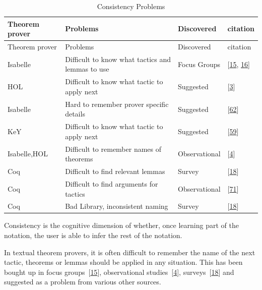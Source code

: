 \documentclass[
]{article}
\begin{document}
\hypertarget{tbl:consistency}{}
\begin{longtable}[]{@{}llll@{}}
\caption{\label{tbl:consistency}Consistency Problems}\tabularnewline
\toprule
Theorem prover & Problems & Discovered & citation \\
\midrule
\endfirsthead
\toprule
Theorem prover & Problems & Discovered & citation \\
\midrule
\endhead
Isabelle & Difficult to know what tactics and lemmas to use & Focus
Groups & {[}\protect\hyperlink{ref-beckert_usability_2015}{15},
\protect\hyperlink{ref-beckert_interaction_2017}{16}{]} \\
HOL & Difficult to know what tactic to apply next & Suggested &
{[}\protect\hyperlink{ref-aitken_interactive_1998}{3}{]} \\
Isabelle & Hard to remember prover specific details & Suggested &
{[}\protect\hyperlink{ref-nagashima_pamper_2018}{62}{]} \\
KeY & Difficult to know what tactic to apply next & Suggested &
{[}\protect\hyperlink{ref-mitsch_keymaera_2017}{59}{]} \\
Isabelle,HOL & Difficult to remember names of theorems & Observational &
{[}\protect\hyperlink{ref-aitken_analysis_2000}{4}{]} \\
Coq & Difficult to find relevant lemmas & Survey &
{[}\protect\hyperlink{ref-berman_development_2014}{18}{]} \\
Coq & Difficult to find arguments for tactics & Observational &
{[}\protect\hyperlink{ref-ringer_replica_2020}{71}{]} \\
Coq & Bad Library, inconsistent naming & Survey &
{[}\protect\hyperlink{ref-berman_development_2014}{18}{]} \\
\bottomrule
\end{longtable}

Consistency is the cognitive dimension of whether, once learning part of
the notation, the user is able to infer the rest of the notation.

In textual theorem provers, it is often difficult to remember the name
of the next tactic, theorems or lemmas should be applied in any
situation. This has been bought up in focus
groups~{[}\protect\hyperlink{ref-beckert_usability_2015}{15}{]},
observational
studies~{[}\protect\hyperlink{ref-aitken_analysis_2000}{4}{]},
surveys~{[}\protect\hyperlink{ref-berman_development_2014}{18}{]} and
suggested as a problem from various other sources.
\end{document}
